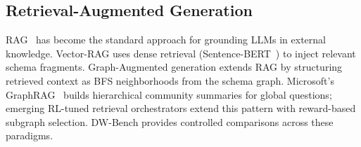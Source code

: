\subsection{Retrieval-Augmented Generation}

RAG~\cite{lewis2020rag} has become the standard approach for grounding
LLMs in external knowledge.  Vector-RAG uses dense retrieval
(Sentence-BERT~\cite{reimers2019sentencebert}) to inject relevant
schema fragments.  Graph-Augmented generation extends RAG by structuring
retrieved context as BFS neighborhoods from the schema graph.
Microsoft's GraphRAG~\cite{graphrag2024} builds hierarchical community
summaries for global questions; emerging RL-tuned retrieval
orchestrators extend this pattern with reward-based subgraph selection.
DW-Bench provides controlled comparisons across these paradigms.

